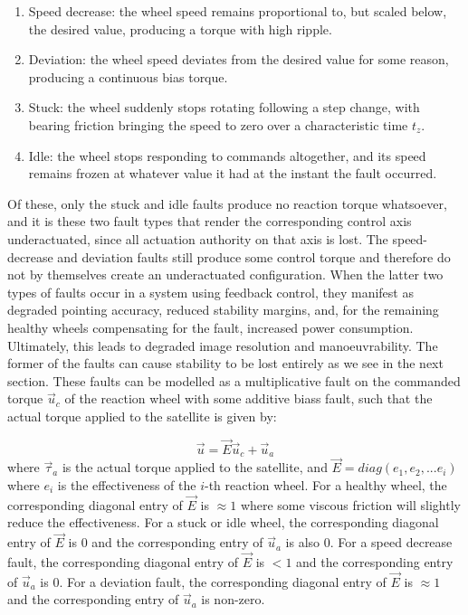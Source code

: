 \begin{enumerate}
    \item \label{fault:speed_decrease} Speed decrease: the wheel speed remains proportional to, but scaled below, the desired value, producing a torque with high ripple.
    \item \label{fault:deviation} Deviation: the wheel speed deviates from the desired value for some reason, producing a continuous bias torque.
    \item \label{fault:stuck} Stuck: the wheel suddenly stops rotating following a step change, with bearing friction bringing the speed to zero over a characteristic time $t_z$.
    \item \label{fault:idle} Idle: the wheel stops responding to commands altogether, and its speed remains frozen at whatever value it had at the instant the fault occurred.
\end{enumerate} %

Of these, only the stuck and idle faults produce no reaction torque whatsoever, and it is these two fault types that render the corresponding control axis underactuated, since all actuation authority on that axis is lost. The speed-decrease and deviation faults still produce some control torque and therefore do not by themselves create an underactuated configuration. When the latter two types of faults occur in a system using feedback control, they manifest as degraded pointing accuracy, reduced stability margins, and, for the remaining healthy wheels compensating for the fault, increased power consumption. Ultimately, this leads to degraded image resolution and manoeuvrability. The former of the faults can cause stability to be lost entirely as we see in the next section. 
These faults can be modelled as a multiplicative fault on the commanded torque $\vec{u}_c$ of the reaction wheel with some additive biass fault, such that the actual torque applied to the satellite is given by:

\begin{equation}
    \vec{u} = \vec{E} \vec{u}_c + \vec{u}_a
\end{equation}
where $\vec{\tau}_a$ is the actual torque applied to the satellite, and $\vec{E} = diag(e_1, e_2, ... e_i)$ where $e_i$ is the effectiveness of the $i$-th reaction wheel. For a healthy wheel, the corresponding diagonal entry of $\vec{E}$ is $\approx 1$ where some viscous friction will slightly reduce the effectiveness. For a stuck or idle wheel, the corresponding diagonal entry of $\vec{E}$ is $0$ and the corresponding entry of $\vec{u}_a$ is also $0$. For a speed decrease fault, the corresponding diagonal entry of $\vec{E}$ is $< 1$ and the corresponding entry of $\vec{u}_a$ is $0$. For a deviation fault, the corresponding diagonal entry of $\vec{E}$ is $\approx 1$ and the corresponding entry of $\vec{u}_a$ is non-zero.


